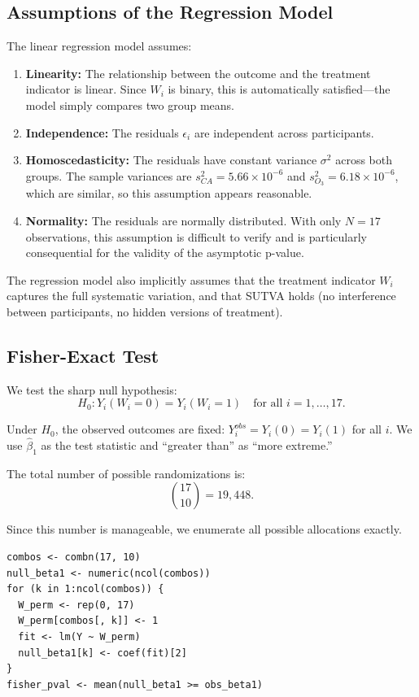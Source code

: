 \documentclass[11pt]{article}
\begin{document}
\subsection*{Assumptions of the Regression Model}

The linear regression model assumes:
\begin{enumerate}
  \item \textbf{Linearity:} The relationship between the outcome and the treatment indicator is linear. Since $W_i$ is binary, this is automatically satisfied---the model simply compares two group means.
  \item \textbf{Independence:} The residuals $\epsilon_i$ are independent across participants.
  \item \textbf{Homoscedasticity:} The residuals have constant variance $\sigma^2$ across both groups. The sample variances are $s_{CA}^2 = 5.66 \times 10^{-6}$ and $s_{O_3}^2 = 6.18 \times 10^{-6}$, which are similar, so this assumption appears reasonable.
  \item \textbf{Normality:} The residuals are normally distributed. With only $N = 17$ observations, this assumption is difficult to verify and is particularly consequential for the validity of the asymptotic p-value.
\end{enumerate}

The regression model also implicitly assumes that the treatment indicator $W_i$ captures the full systematic variation, and that SUTVA holds (no interference between participants, no hidden versions of treatment).

\subsection*{Fisher-Exact Test}

We test the sharp null hypothesis:
\[
  H_0: Y_i(W_i = 0) = Y_i(W_i = 1) \quad \text{for all } i = 1, \ldots, 17.
\]

Under $H_0$, the observed outcomes are fixed: $Y_i^{obs} = Y_i(0) = Y_i(1)$ for all $i$. We use $\hat{\beta}_1$ as the test statistic and ``greater than'' as ``more extreme.''

The total number of possible randomizations is:
\[
  \binom{17}{10} = 19{,}448.
\]

Since this number is manageable, we enumerate all possible allocations exactly.

\begin{lstlisting}
combos <- combn(17, 10)
null_beta1 <- numeric(ncol(combos))
for (k in 1:ncol(combos)) {
  W_perm <- rep(0, 17)
  W_perm[combos[, k]] <- 1
  fit <- lm(Y ~ W_perm)
  null_beta1[k] <- coef(fit)[2]
}
fisher_pval <- mean(null_beta1 >= obs_beta1)
\end{lstlisting}
\end{document}
